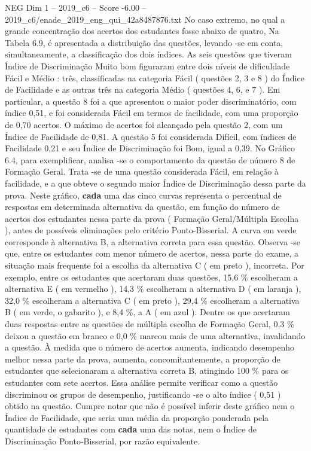 \begin{textsample}{NEG Dim 1 – 2019\_c6 – Score -6.00 – 2019\_c6/enade\_2019\_eng\_qui\_42a8487876.txt}
No caso extremo, no qual a grande concentração dos acertos dos estudantes fosse abaixo de quatro, Na Tabela 6.9, é apresentada a distribuição das questões, levando -se em conta, simultaneamente, a classificação dos dois índices.
As seis questões que tiveram Índice de Discriminação Muito bom figuraram entre dois níveis de dificuldade Fácil e Médio : três, classificadas na categoria Fácil ( questões 2, 3 e 8 ) do Índice de Facilidade e as outras três na categoria Médio ( questões 4, 6, e 7 ).
Em particular, a questão 8 foi a que apresentou o maior poder discriminatório, com índice 0,51, e foi considerada Fácil em termos de facilidade, com uma proporção de 0,70 acertos.
O máximo de acertos foi alcançado pela questão 2, com um Índice de Facilidade de 0,81.
A questão 5 foi considerada Difícil, com índices de Facilidade 0,21 e seu Índice de Discriminação foi Bom, igual a 0,39.
No Gráfico 6.4, para exemplificar, analisa -se o comportamento da questão de número 8 de Formação Geral.
Trata -se de uma questão considerada Fácil, em relação à facilidade, e a que obteve o segundo maior Índice de Discriminação dessa parte da prova.
Neste gráfico, \textbf{cada} uma das cinco curvas representa o percentual de respostas em determinada alternativa da questão, em função do número de acertos dos estudantes nessa parte da prova ( Formação Geral/Múltipla Escolha ), antes de possíveis eliminações pelo critério Ponto-Bisserial.
A curva em verde corresponde à alternativa B, a alternativa correta para essa questão.
Observa -se que, entre os estudantes com menor número de acertos, nessa parte do exame, a situação mais frequente foi a escolha da alternativa C ( em preto ), incorreta.
Por exemplo, entre os estudantes que acertaram duas questões, 15,6 \% escolheram a alternativa E ( em vermelho ), 14,3 \% escolheram a alternativa D ( em laranja ), 32,0 \% escolheram a alternativa C ( em preto ), 29,4 \% escolheram a alternativa B ( em verde, o gabarito ), e 8,4 \%, a A ( em azul ).
Dentre os que acertaram duas respostas entre as questões de múltipla escolha de Formação Geral, 0,3 \% deixou a questão em branco e 0,0 \% marcou mais de uma alternativa, invalidando a questão.
À medida que o número de acertos aumenta, indicando desempenho melhor nessa parte da prova, aumenta, concomitantemente, a proporção de estudantes que selecionaram a alternativa correta B, atingindo 100 \% para os estudantes com sete acertos.
Essa análise permite verificar como a questão discriminou os grupos de desempenho, justificando -se o alto índice ( 0,51 ) obtido na questão.
Cumpre notar que não é possível inferir deste gráfico nem o Índice de Facilidade, que seria uma média da proporção ponderada pela quantidade de estudantes com \textbf{cada} uma das notas, nem o Índice de Discriminação Ponto-Bisserial, por razão equivalente.

\end{textsample}
